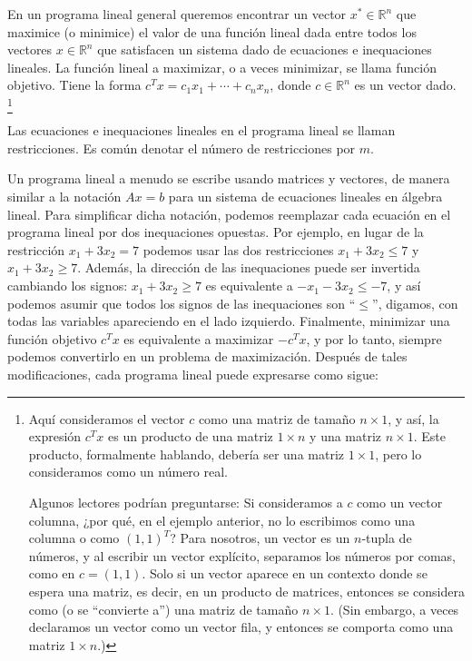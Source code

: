 \documentclass{article}
\begin{document}
En un programa lineal general queremos encontrar un vector \( x^* \in \mathbb{R}^n \) que maximice (o minimice) el valor de una función lineal dada entre todos los vectores \( x \in \mathbb{R}^n \) que satisfacen un sistema dado de ecuaciones e inequaciones lineales. La función lineal a maximizar, o a veces minimizar, se llama función objetivo. Tiene la forma \( c^T x = c_1x_1 + \cdots + c_nx_n \), donde \( c \in \mathbb{R}^n \) es un vector dado. \footnote{Aquí consideramos el vector \( c \) como una matriz de tamaño \( n \times 1 \), y así, la expresión \( c^T x \) es un producto de una matriz \( 1 \times n \) y una matriz \( n \times 1 \). Este producto, formalmente hablando, debería ser una matriz \( 1 \times 1 \), pero lo consideramos como un número real.

Algunos lectores podrían preguntarse: Si consideramos a \( c \) como un vector columna, ¿por qué, en el ejemplo anterior, no lo escribimos como una columna o como \( (1, 1)^T \)? Para nosotros, un vector es un \( n \)-tupla de números, y al escribir un vector explícito, separamos los números por comas, como en \( c = (1, 1) \). Solo si un vector aparece en un contexto donde se espera una matriz, es decir, en un producto de matrices, entonces se considera como (o se “convierte a”) una matriz de tamaño \( n \times 1 \). (Sin embargo, a veces declaramos un vector como un vector fila, y entonces se comporta como una matriz \( 1 \times n \).)}

Las ecuaciones e inequaciones lineales en el programa lineal se llaman restricciones. Es común denotar el número de restricciones por \( m \).

Un programa lineal a menudo se escribe usando matrices y vectores, de manera similar a la notación \( Ax = b \) para un sistema de ecuaciones lineales en álgebra lineal. Para simplificar dicha notación, podemos reemplazar cada ecuación en el programa lineal por dos inequaciones opuestas. Por ejemplo, en lugar de la restricción \( x_1 + 3x_2 = 7 \) podemos usar las dos restricciones \( x_1 + 3x_2 \leq 7 \) y \( x_1 + 3x_2 \geq 7 \). Además, la dirección de las inequaciones puede ser invertida cambiando los signos: \( x_1 + 3x_2 \geq 7 \) es equivalente a \( -x_1 - 3x_2 \leq -7 \), y así podemos asumir que todos los signos de las inequaciones son “\(\leq\)”, digamos, con todas las variables apareciendo en el lado izquierdo. Finalmente, minimizar una función objetivo \( c^T x \) es equivalente a maximizar \( -c^T x \), y por lo tanto, siempre podemos convertirlo en un problema de maximización. Después de tales modificaciones, cada programa lineal puede expresarse como sigue:
\end{document}
